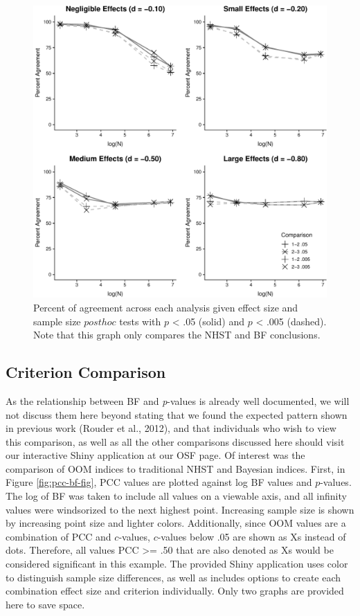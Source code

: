 \documentclass[,man, mask]{apa6}
\begin{document}
\begin{figure}
\centering
\includegraphics{alt_nhst_FINAL_files/figure-latex/agree-graph-post-1.pdf}
\caption{\label{fig:agree-graph-post}Percent of agreement across each analysis given effect size and sample size \(post hoc\) tests with \(p\) \textless{} .05 (solid) and \(p\) \textless{} .005 (dashed). Note that this graph only compares the NHST and BF conclusions.}
\end{figure}

\hypertarget{criterion-comparison}{%
\subsection{Criterion Comparison}\label{criterion-comparison}}

As the relationship between BF and \emph{p}-values is already well documented, we will not discuss them here beyond stating that we found the expected pattern shown in previous work (Rouder et al., 2012), and that individuals who wish to view this comparison, as well as all the other comparisons discussed here should visit our interactive Shiny application at our OSF page. Of interest was the comparison of OOM indices to traditional NHST and Bayesian indices. First, in Figure \ref{fig:pcc-bf-fig}, PCC values are plotted against log BF values and \(p\)-values. The log of BF was taken to include all values on a viewable axis, and all infinity values were windsorized to the next highest point. Increasing sample size is shown by increasing point size and lighter colors. Additionally, since OOM values are a combination of PCC and \(c\)-values, \(c\)-values below .05 are shown as Xs instead of dots. Therefore, all values PCC \textgreater{}= .50 that are also denoted as Xs would be considered significant in this example. The provided Shiny application uses color to distinguish sample size differences, as well as includes options to create each combination effect size and criterion individually. Only two graphs are provided here to save space.
\end{document}
